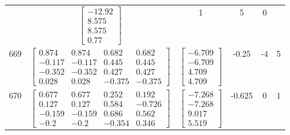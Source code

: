 \documentclass[a4paper,12pt]{article}
\begin{document}
\begin{tabular}{c c c c c c}
&
$\begin{bmatrix} -12.92 \\ 8.575 \\ 8.575 \\ 0.77 \end{bmatrix}$
&
1
&
5
&
0
\\
669
&
$\begin{bmatrix} 0.874 & 0.874 & 0.682 & 0.682 \\ -0.117 & -0.117 & 0.445 & 0.445 \\ -0.352 & -0.352 & 0.427 & 0.427 \\ 0.028 & 0.028 & -0.375 & -0.375 \end{bmatrix}$
&
$\begin{bmatrix} -6.709 \\ -6.709 \\ 4.709 \\ 4.709 \end{bmatrix}$
&
-0.25
&
-4
&
5
\\
670
&
$\begin{bmatrix} 0.677 & 0.677 & 0.252 & 0.192 \\ 0.127 & 0.127 & 0.584 & -0.726 \\ -0.159 & -0.159 & 0.686 & 0.562 \\ -0.2 & -0.2 & -0.354 & 0.346 \end{bmatrix}$
&
$\begin{bmatrix} -7.268 \\ -7.268 \\ 9.017 \\ 5.519 \end{bmatrix}$
&
-0.625
&
0
&
1
\\
\end{tabular} \egroup \newpage
\end{document}
